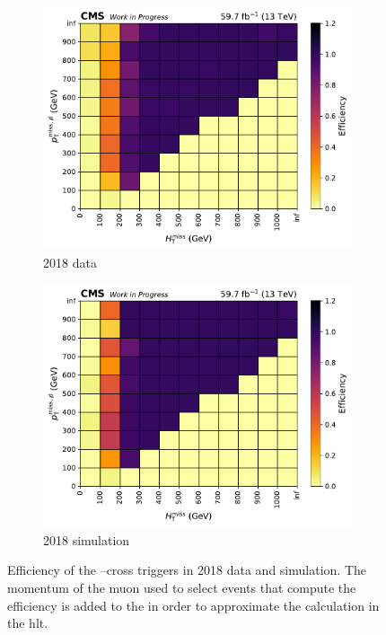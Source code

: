 \begin{figure}[htbp]
    \centering
    \begin{subfigure}[b]{0.48\textwidth}
        \includegraphics[width=\textwidth]{figures/trigger_efficiencies/2018/eff-data--n.pdf}
        \caption{2018 data}
    \end{subfigure}
    \hfill
    \begin{subfigure}[b]{0.48\textwidth}
        \includegraphics[width=\textwidth]{figures/trigger_efficiencies/2018/eff-mc--genWeight-sumw.pdf}
        \caption{2018 simulation}
    \end{subfigure}
    \caption[Efficiency of the HLT \ptmiss--\mht cross triggers in 2018 data and simulation]{Efficiency of the \ptmiss--\mht cross triggers in 2018 data and simulation. The momentum of the muon used to select events that compute the efficiency is added to the \ptmiss in order to approximate the calculation in the \acrlong{hlt}.}
    \label{fig:htoinv_trig_effs_2018}
\end{figure}

